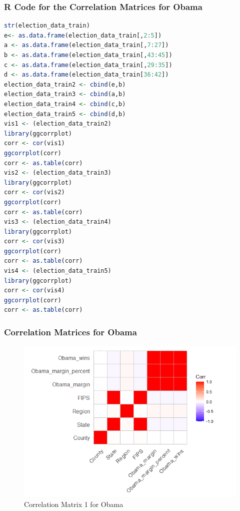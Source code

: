 \documentclass[11pt]{article}
\begin{document}
\subsubsection{R Code for the Correlation Matrices for Obama}
\begin{lstlisting}[language=R]
str(election_data_train)
e<- as.data.frame(election_data_train[,2:5])
a <- as.data.frame(election_data_train[,7:27])
b <- as.data.frame(election_data_train[,43:45])
c <- as.data.frame(election_data_train[,29:35])
d <- as.data.frame(election_data_train[36:42])
election_data_train2 <- cbind(e,b)
election_data_train3 <- cbind(a,b)
election_data_train4 <- cbind(c,b)
election_data_train5 <- cbind(d,b)
vis1 <- (election_data_train2)
library(ggcorrplot)
corr <- cor(vis1)
ggcorrplot(corr)
corr <- as.table(corr)
vis2 <- (election_data_train3)
library(ggcorrplot)
corr <- cor(vis2)
ggcorrplot(corr)
corr <- as.table(corr)
vis3 <- (election_data_train4)
library(ggcorrplot)
corr <- cor(vis3)
ggcorrplot(corr)
corr <- as.table(corr)
vis4 <- (election_data_train5)
library(ggcorrplot)
corr <- cor(vis4)
ggcorrplot(corr)
corr <- as.table(corr)
\end{lstlisting}

\subsubsection{Correlation Matrices for Obama}
\begin{figure}[H]
    \centering
    \includegraphics[width=0.90\columnwidth]{assets/oc1.PNG}
    \caption{Correlation Matrix 1 for Obama}
    \label{lr}
\end{figure}
\end{document}
